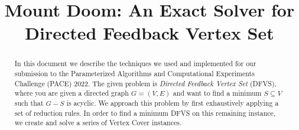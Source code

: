 \documentclass[a4paper,USenglish,cleveref, autoref, thm-restate, authorcolumns]{template/lipics-v2021}
\title{Mount Doom: An Exact Solver for Directed Feedback Vertex Set} %
\begin{document}
\maketitle

\begin{abstract}
In this document we describe the techniques we used and implemented for our submission to the Parameterized Algorithms and Computational Experiments Challenge (PACE) 2022. The given problem is \emph{Directed Feedback Vertex Set} (DFVS), where you are given a directed graph $G=(V,E)$ and want to find a minimum $S\subseteq V$ such that $G-S$ is acyclic.
We approach this problem by first exhaustively applying a set of reduction rules. 
In order to find a minimum DFVS on this remaining instance, we create and solve a series of Vertex Cover instances.
\end{abstract}

% 








\appendix
\end{document}

